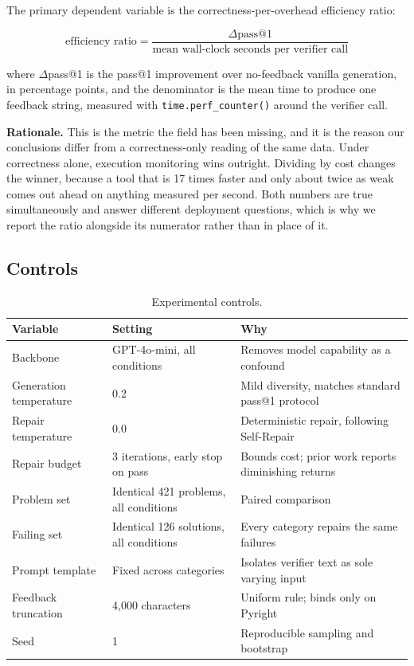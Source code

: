 The primary dependent variable is the correctness-per-overhead efficiency ratio:

\begin{equation}
\text{efficiency ratio} = \frac{\Delta\text{pass@1}}{\text{mean wall-clock seconds per verifier call}}
\end{equation}

where $\Delta$pass@1 is the pass@1 improvement over no-feedback vanilla generation, in percentage points, and the denominator is the mean time to produce one feedback string, measured with \texttt{time.perf\_counter()} around the verifier call.

\textbf{Rationale.} This is the metric the field has been missing, and it is the reason our conclusions differ from a correctness-only reading of the same data. Under correctness alone, execution monitoring wins outright. Dividing by cost changes the winner, because a tool that is 17 times faster and only about twice as weak comes out ahead on anything measured per second. Both numbers are true simultaneously and answer different deployment questions, which is why we report the ratio alongside its numerator rather than in place of it.

\subsection{Controls}

\begin{table}[h]
\centering
\caption{Experimental controls.}
\label{tab:controls}
\begin{tabular}{lll}
\toprule
Variable & Setting & Why \\
\midrule
Backbone & GPT-4o-mini, all conditions & Removes model capability as a confound \\
Generation temperature & 0.2 & Mild diversity, matches standard pass@1 protocol \\
Repair temperature & 0.0 & Deterministic repair, following Self-Repair \\
Repair budget & 3 iterations, early stop on pass & Bounds cost; prior work reports diminishing returns \\
Problem set & Identical 421 problems, all conditions & Paired comparison \\
Failing set & Identical 126 solutions, all conditions & Every category repairs the same failures \\
Prompt template & Fixed across categories & Isolates verifier text as sole varying input \\
Feedback truncation & 4,000 characters & Uniform rule; binds only on Pyright \\
Seed & 1 & Reproducible sampling and bootstrap \\
\bottomrule
\end{tabular}
\end{table}

